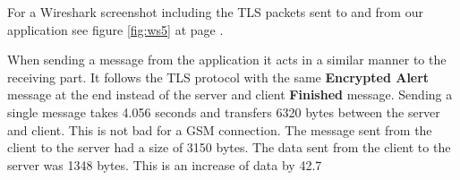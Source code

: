 For a Wireshark screenshot including the TLS packets sent to and from our application see figure \ref{fig:ws5} at page \pageref{fig:ws5}.


When sending a message from the application it acts in a similar manner to the receiving part. It follows the TLS protocol with the same \textbf{Encrypted Alert} message at the end instead of the server and client \textbf{Finished} message. 
\newline
\newline
Sending a single message takes 4.056 seconds and transfers 6320 bytes between the server and client. This is not bad for a GSM connection. The message sent from the client to the server had a size of 3150 bytes. The data sent from the client to the server was 1348 bytes.
This is an increase of data by 42.7%
